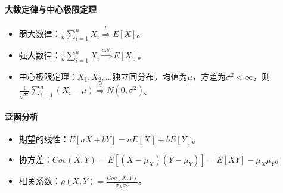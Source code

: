 \documentclass[
12pt, %
a4paper, 
oneside, %
headinclude,footinclude, %
]{scrartcl}
\begin{document}
\paragraph*{大数定律与中心极限定理}
\begin{itemize}
\item 弱大数律：$ \frac{1}{n} \sum_{i=1}^n X_i \overset{p}{\Longrightarrow} E[X] $。
\item 强大数律：$ \frac{1}{n} \sum_{i=1}^n X_i \overset{a.s.}{\Longrightarrow} E[X] $。
\item 中心极限定理：$ X_1, X_2, \dots $独立同分布，均值为$ \mu $，方差为$ \sigma^2 < \infty $，则$ \frac{1}{\sqrt{n}} \sum_{i=1}^n (X_i - \mu) \overset{d}{\Longrightarrow} N(0, \sigma^2) $。
\end{itemize}
\paragraph*{泛函分析}
\begin{itemize}
\item 期望的线性：$ E[aX + bY] = a E[X] + b E[Y] $。
\item 协方差：$ Cov(X, Y) = E[(X - \mu_X)(Y - \mu_Y)] = E[XY] - \mu_X \mu_Y $。
\item 相关系数：$ \rho(X, Y) = \frac{Cov(X, Y)}{\sigma_X \sigma_Y} $。
\end{itemize}
\end{document}
